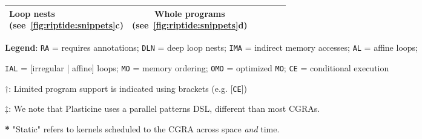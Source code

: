 {\begin{table}[htb]
\begin{threeparttable}
{\begin{tabular}{p{3cm}|cccc|c}
        \thead{Loop nests \\ (see~\autoref{fig:riptide:snippets}c)} &
        \thead{Whole programs \\ (see~\autoref{fig:riptide:snippets}d)}	
      \\[.5ex]
			\bottomrule
		 \end{tabular}
	}
  \begin{tablenotes}
    \tiny
  \item \textbf{Legend}: \texttt{RA} = requires annotations; \texttt{DLN} = deep loop nests; \texttt{IMA} = indirect memory accesses; \texttt{AL} = affine loops;
  \item \texttt{IAL} = [irregular | affine] loops; \texttt{MO} = memory ordering; \texttt{OMO} = optimized \texttt{MO}; \texttt{CE} = conditional execution
  \item \textbf{$\dagger$}: Limited program support is indicated using brackets (e.g. [\texttt{CE}])
  \item \textbf{$\ddagger$}: We note that Plasticine uses a parallel patterns DSL, different than most CGRAs. 
  \item \textbf{*} "Static" refers to kernels scheduled to the CGRA across space \textit{and} time.
  \end{tablenotes}
  \end{threeparttable}
	\end{table}
}

